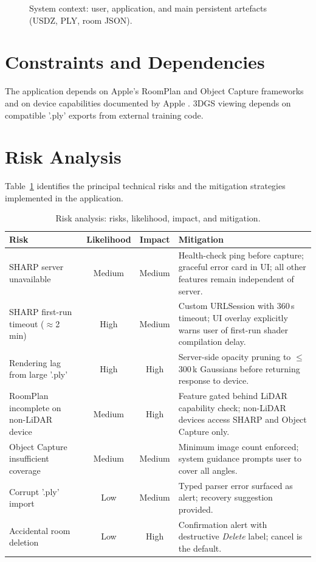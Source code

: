 \begin{figure}[H]
\centering

\caption{System context: user, application, and main persistent artefacts (USDZ, PLY, room JSON).}
\label{fig:context_req}
\end{figure}

\section{Constraints and Dependencies}

The application depends on Apple's RoomPlan and Object Capture frameworks and on device capabilities documented by Apple \cite{apple2024roomplan2}. 3DGS viewing depends on compatible '.ply' exports from external training code. 

\section{Risk Analysis}

Table~\ref{tab:risks} identifies the principal technical risks and the
mitigation strategies implemented in the application.

\begin{table}[h]
\centering
\caption{Risk analysis: risks, likelihood, impact, and mitigation.}
\label{tab:risks}
\setlength{\tabcolsep}{6pt}
\renewcommand{\arraystretch}{1.3}
\begin{tabular}{p{3.0cm} c c p{5.2cm}}
\toprule
\textbf{Risk} & \textbf{Likelihood} & \textbf{Impact} & \textbf{Mitigation} \\
\midrule
\rowcolor{gray!8}
SHARP server unavailable
  & Medium & Medium
  & Health-check ping before capture; graceful error card in UI; all other
    features remain independent of server. \\
SHARP first-run timeout ($\approx$2\,min)
  & High & Medium
  & Custom URLSession with 360\,s timeout; UI overlay explicitly
    warns user of first-run shader compilation delay. \\
\rowcolor{gray!8}
Rendering lag from large '.ply'
  & High & High
  & Server-side opacity pruning to ${\leq}$300\,k Gaussians before
    returning response to device. \\
RoomPlan incomplete on non-LiDAR device
  & Medium & High
  & Feature gated behind LiDAR capability check; non-LiDAR devices access
    SHARP and Object Capture only. \\
\rowcolor{gray!8}
Object Capture insufficient coverage
  & Medium & Medium
  & Minimum image count enforced; system guidance prompts user to cover
    all angles. \\
Corrupt '.ply' import
  & Low & Medium
  & Typed parser error surfaced as alert; recovery suggestion provided. \\
\rowcolor{gray!8}
Accidental room deletion
  & Low & High
  & Confirmation alert with destructive \emph{Delete} label; cancel is
    the default. \\
\bottomrule
\end{tabular}
\end{table}


